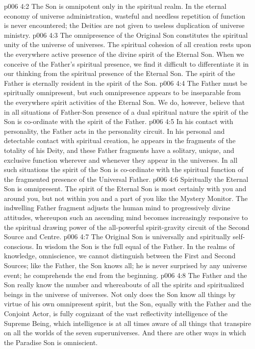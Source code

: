 \vs p006 4:2 \pc The Son is omnipotent only in the spiritual realm. In the eternal economy of universe administration, wasteful and needless repetition of function is never encountered; the Deities are not given to useless duplication of universe ministry.
\vs p006 4:3 \pc The omnipresence of the Original Son constitutes the spiritual unity of the universe of universes. The spiritual cohesion of all creation rests upon the everywhere active presence of the divine spirit of the Eternal Son. When we conceive of the Father’s spiritual presence, we find it difficult to differentiate it in our thinking from the spiritual presence of the Eternal Son. The spirit of the Father is eternally resident in the spirit of the Son.
\vs p006 4:4 The Father must be spiritually omnipresent, but such omnipresence appears to be inseparable from the everywhere spirit activities of the Eternal Son. We do, however, believe that in all situations of Father\hyp{}Son presence of a dual spiritual nature the spirit of the Son is co\hyp{}ordinate with the spirit of the Father.
\vs p006 4:5 In his contact with personality, the Father acts in the personality circuit. In his personal and detectable contact with spiritual creation, he appears in the fragments of the totality of his Deity, and these Father fragments have a solitary, unique, and exclusive function wherever and whenever they appear in the universes. In all such situations the spirit of the Son is co\hyp{}ordinate with the spiritual function of the fragmented presence of the Universal Father.
\vs p006 4:6 Spiritually the Eternal Son is omnipresent. The spirit of the Eternal Son is most certainly with you and around you, but not within you and a part of you like the Mystery Monitor. The indwelling Father fragment adjusts the human mind to progressively divine attitudes, whereupon such an ascending mind becomes increasingly responsive to the spiritual drawing power of the all\hyp{}powerful spirit\hyp{}gravity circuit of the Second Source and Centre.
\vs p006 4:7 \pc The Original Son is universally and spiritually self\hyp{}conscious. In wisdom the Son is the full equal of the Father. In the realms of knowledge, omniscience, we cannot distinguish between the First and Second Sources; like the Father, the Son knows all; he is never surprised by any universe event; he comprehends the end from the beginning.
\vs p006 4:8 \pc The Father and the Son really know the number and whereabouts of all the spirits and spiritualized beings in the universe of universes. Not only does the Son know all things by virtue of his own omnipresent spirit, but the Son, equally with the Father and the Conjoint Actor, is fully cognizant of the vast reflectivity intelligence of the Supreme Being, which intelligence is at all times aware of all things that transpire on all the worlds of the seven superuniverses. And there are other ways in which the Paradise Son is omniscient.
